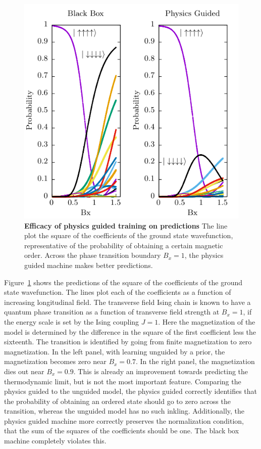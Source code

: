 \begin{figure}
	\includegraphics{figures/4-site-gs-coeff.pdf}
	\caption{\textbf{Efficacy of physics guided training on predictions} 
	The line plot the square of the coefficients of the ground state 
	wavefunction, representative of the probability of obtaining 
	a certain magnetic order. Across the phase transition boundary $B_x = 1$, 
	the physics guided machine makes better predictions.}	
	\label{4-site-gs-coeff}
\end{figure}


Figure~\ref{4-site-gs-coeff} shows the predictions of the square of the
coefficients of the ground state wavefunction. The lines plot each of the
coefficients as a function of increasing longitudinal field. The transverse
field Ising chain is known to have a quantum phase transition as a function of
transverse field strength at $B_x = 1$, if the energy scale is set by the Ising
coupling $J = 1$.  Here the magnetization of the model is determined by the
difference in the square of the first coefficient less the sixteenth. The
transition is identified by going from finite magnetization to zero
magnetization. In the left panel, with learning unguided by a prior, the
magnetization becomes zero near $B_x = 0.7$. In the right panel, the
magnetization dies out near $B_x = 0.9$.  This is already an improvement
towards predicting the thermodynamic limit, but is not the most important
feature. Comparing the physics guided to the unguided model, the physics guided
correctly identifies that the probability of obtaining an ordered state should
go to zero across the transition, whereas the unguided model has no such
inkling. Additionally, the physics guided machine more correctly preserves the
normalization condition, that the sum of the squares of the coefficients should
be one.  The black box machine completely violates this. 

